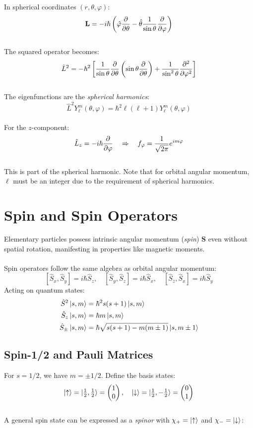 In spherical coordinates $(r, \theta, \varphi)$:
\[
    \mathbf{L} = -i\hbar\left(\hat{\varphi}\pdv{\theta} - \hat{\theta}\frac{1}{\sin\theta}\pdv{\varphi}\right)
\]\\
The squared operator becomes:
\[
    \hat{L}^2 = -\hbar^2\left[\frac{1}{\sin\theta}\pdv{\theta}\left(\sin\theta\pdv{\theta}\right) + \frac{1}{\sin^2\theta}\pdv[2]{\varphi}\right]
\]\\
The eigenfunctions are the \emph{spherical harmonics}:
\[
    \hat{L}^2 Y_{\ell}^{m}(\theta,\varphi) = \hbar^2\ell(\ell+1)Y_{\ell}^{m}(\theta,\varphi)
\]\\
For the $z$-component:
\[
    \hat{L}_z = -i\hbar\pdv{\varphi} \quad \Rightarrow \quad f_\varphi = \frac{1}{\sqrt{2\pi}}e^{im\varphi}
\]\\
This is part of the spherical harmonic. Note that for orbital angular momentum, $\ell$ must be an integer due to the requirement of spherical harmonics.

\section{Spin and Spin Operators}\label{spin1}

Elementary particles possess intrinsic angular momentum (\emph{spin}) $\mathbf{S}$ even without spatial rotation, manifesting in properties like magnetic moments.\\ \\
Spin operators follow the same algebra as orbital angular momentum:
\[
    [\hat{S}_x, \hat{S}_y] = i\hbar\hat{S}_z, \quad
    [\hat{S}_y, \hat{S}_z] = i\hbar\hat{S}_x, \quad
    [\hat{S}_z, \hat{S}_x] = i\hbar\hat{S}_y
\]
Acting on quantum states:
\[\begin{aligned}
    \hat{S}^2\ket{s,m} &= \hbar^2 s(s+1)\ket{s,m} \\
    \hat{S}_z\ket{s,m} &= \hbar m\ket{s,m} \\
    \hat{S}_{\pm}\ket{s,m} &= \hbar\sqrt{s(s+1)-m(m\pm1)}\ket{s,m\pm1}
\end{aligned}\]

\subsection{Spin-1/2 and Pauli Matrices}

For $s = 1/2$, we have $m = \pm1/2$. Define the basis states:
\[
    \ket{\uparrow} = \ket{\tfrac{1}{2},\tfrac{1}{2}} = \begin{pmatrix} 1 \\ 0 \end{pmatrix}, \quad
    \ket{\downarrow} = \ket{\tfrac{1}{2},-\tfrac{1}{2}} = \begin{pmatrix} 0 \\ 1 \end{pmatrix}
\]\\
A general spin state can be expressed as a \emph{spinor} with 
$\chi_+ = \ket{\uparrow}$ and $\chi_-=\ket{\downarrow}$:

